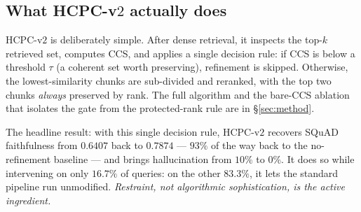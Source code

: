 \subsection{What HCPC-v$2$ actually does}
\label{sec:paradox:v2_intuition}

HCPC-v$2$ is deliberately simple. After dense retrieval, it inspects
the top-$k$ retrieved set, computes CCS, and applies a single decision
rule: if CCS is below a threshold $\tau$ (a coherent set worth
preserving), refinement is skipped. Otherwise, the lowest-similarity
chunks are sub-divided and reranked, with the top two chunks
\emph{always} preserved by rank. The full algorithm and the bare-CCS
ablation that isolates the gate from the protected-rank rule are in
\S\ref{sec:method}.

The headline result: with this single decision rule, HCPC-v$2$
recovers SQuAD faithfulness from $0.6407$ back to $0.7874$ --- $93\%$
of the way back to the no-refinement baseline --- and brings
hallucination from $10\%$ to $0\%$. It does so while intervening on
only $16.7\%$ of queries: on the other $83.3\%$, it lets the standard
pipeline run unmodified. \emph{Restraint, not algorithmic
sophistication, is the active ingredient.}
